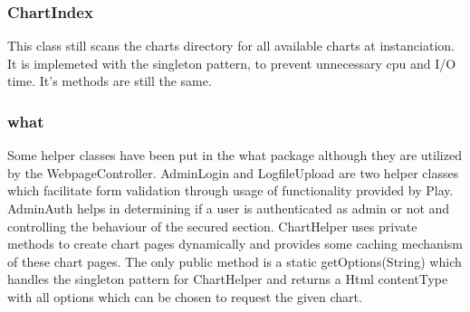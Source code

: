 \subsubsection{ChartIndex}
This class still scans the charts directory for all available charts at instanciation.
It is implemeted with the singleton pattern, to prevent unnecessary cpu and I/O time.
It's methods are still the same.

\subsubsection{what}
Some helper classes have been put in the what package although they are utilized by the WebpageController.
AdminLogin and LogfileUpload are two helper classes which facilitate form validation through usage of
functionality provided by Play.
AdminAuth helps in determining if a user is authenticated as admin or not and controlling the behaviour
of the secured section.
ChartHelper uses private methods to create chart pages dynamically and provides some caching mechanism
of these chart pages. The only public method is a static getOptions(String) which handles the singleton pattern
for ChartHelper and returns a Html contentType with all options which can be chosen to request the given chart.


 